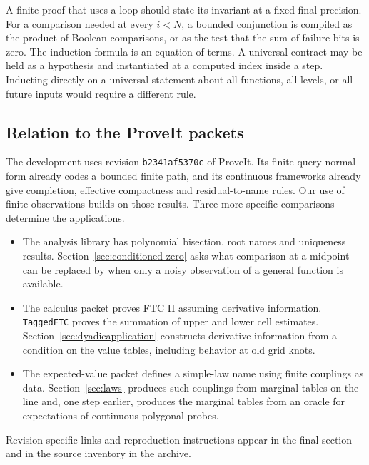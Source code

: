 A finite proof that uses a loop should state its invariant at a fixed final
precision. For a comparison needed at every $i<N$, a bounded conjunction is
compiled as the product of Boolean comparisons, or as the test that the sum of
failure bits is zero. The induction formula is an equation of terms. A universal
contract may be held as a hypothesis and instantiated at a computed index
inside a step. Inducting directly on a universal statement about all functions,
all levels, or all future inputs would require a different rule.

\subsection{Relation to the ProveIt packets}

The development uses revision \texttt{b2341af5370c} of ProveIt. Its
finite-query normal form already codes a bounded finite path, and its continuous
frameworks already give completion, effective compactness and residual-to-name
rules. Our use of finite observations builds on those results. Three more
specific comparisons determine the applications.

\begin{itemize}
\item The analysis library has polynomial bisection, root names and uniqueness
results. Section~\ref{sec:conditioned-zero} asks what comparison at a midpoint can
be replaced by when only a noisy observation of a general function is available.
\item The calculus packet proves FTC II assuming derivative information.
\texttt{TaggedFTC} proves the summation of upper and lower cell estimates.
Section~\ref{sec:dyadicapplication} constructs derivative information from a
condition on the value tables, including behavior at old grid knots.
\item The expected-value packet defines a simple-law name using finite
couplings as data. Section~\ref{sec:laws} produces such couplings from
marginal tables on the line and, one step earlier, produces the marginal
tables from an oracle for expectations of continuous polygonal probes.
\end{itemize}
Revision-specific links and reproduction instructions appear in the final
section and in the source inventory in the archive.
